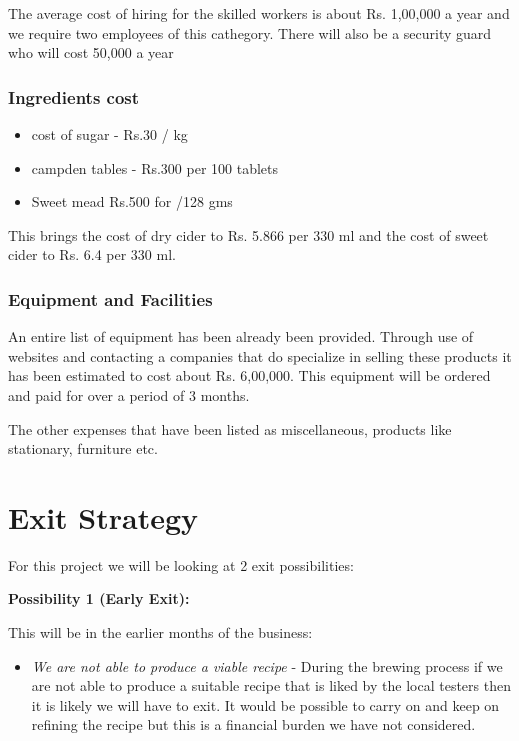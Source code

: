 \documentclass[11pt]{article}
\begin{document}
The average cost of hiring for the skilled workers is about Rs. 1,00,000 a year
and we require two employees of this cathegory. There will also be a security
guard who will cost 50,000 a year

   \subsubsection{Ingredients cost}
\begin{itemize}
\item cost of sugar -  Rs.30 / kg
\item campden tables  - Rs.300 per 100 tablets
\item Sweet mead Rs.500 for /128 gms
\end{itemize}

This brings the cost of dry cider to Rs. 5.866 per 330 ml and the cost of sweet
cider to Rs. 6.4 per 330 ml.

     \subsubsection{Equipment and Facilities}
An entire list of equipment has been already been provided. Through use of
websites and contacting a companies that do specialize in selling these products
it has been estimated to cost about Rs. 6,00,000. This equipment will be
ordered and paid for over a period of 3 months.

The other expenses that have been listed as miscellaneous, products like
stationary, furniture etc.

\newpage


\section{Exit Strategy}
For this project we will be looking at 2 exit possibilities:

\textbf{Possibility 1 (Early Exit):}

This will be in the earlier months of the business:
  \begin{itemize}
	\item \emph{We are not able to produce a viable recipe} - During the brewing
process if we are not able to produce a suitable recipe that is liked by the 
local testers then it is likely we will have to exit. It would be possible to 
carry on and keep on refining the recipe but this is a financial burden we have 
not considered.
  \end{itemize}
\end{document}
